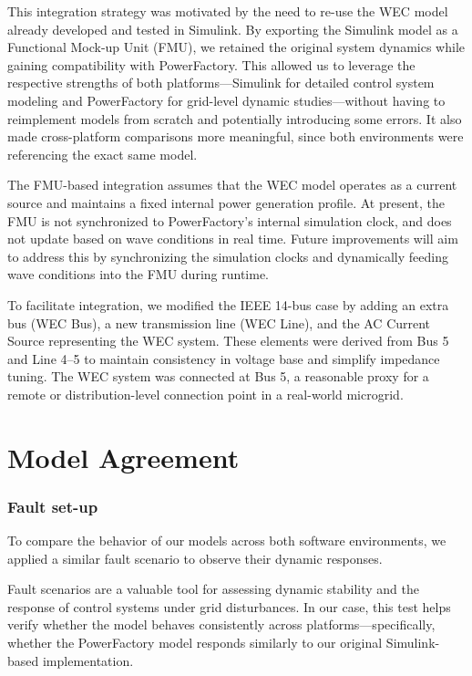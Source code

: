 \documentclass[conference]{IEEEtran}
\begin{document}
    This integration strategy was motivated by the need to re-use the WEC model already developed and tested in Simulink. By exporting the Simulink model as a Functional Mock-up Unit (FMU), we retained the original system dynamics while gaining compatibility with PowerFactory. This allowed us to leverage the respective strengths of both platforms—Simulink for detailed control system modeling and PowerFactory for grid-level dynamic studies—without having to reimplement models from scratch and potentially introducing some errors. It also made cross-platform comparisons more meaningful, since both environments were referencing the exact same model.
    
    The FMU-based integration assumes that the WEC model operates as a current source and maintains a fixed internal power generation profile. At present, the FMU is not synchronized to PowerFactory’s internal simulation clock, and does not update based on wave conditions in real time. Future improvements will aim to address this by synchronizing the simulation clocks and dynamically feeding wave conditions into the FMU during runtime.
    
    To facilitate integration, we modified the IEEE 14-bus case by adding an extra bus (WEC Bus), a new transmission line (WEC Line), and the AC Current Source representing the WEC system. These elements were derived from Bus 5 and Line 4–5 to maintain consistency in voltage base and simplify impedance tuning. The WEC system was connected at Bus 5, a reasonable proxy for a remote or distribution-level connection point in a real-world microgrid.
    
    
        

\section*{Model Agreement}

    \subsubsection{Fault set-up}

        To compare the behavior of our models across both software environments, we applied a similar fault scenario to observe their dynamic responses.

        Fault scenarios are a valuable tool for assessing dynamic stability and the response of control systems under grid disturbances. In our case, this test helps verify whether the model behaves consistently across platforms—specifically, whether the PowerFactory model responds similarly to our original Simulink-based implementation.
        
\end{document}
